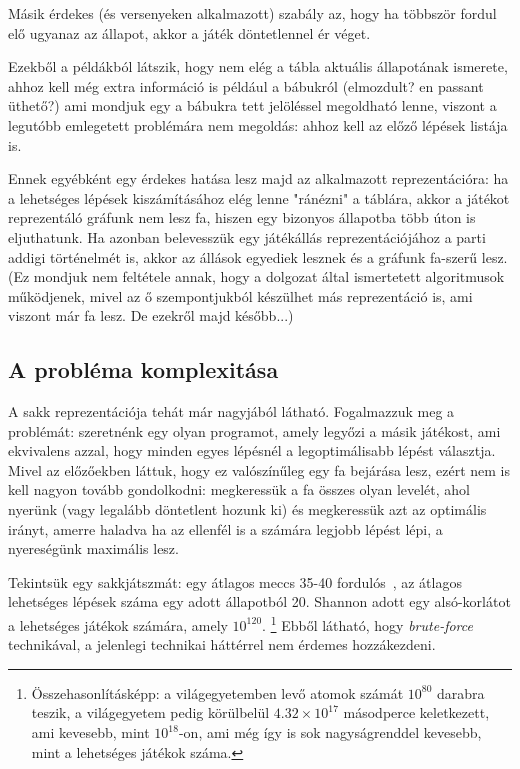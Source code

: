 \documentclass[twoside, a4paper, 12pt]{article}
\begin{document}
Másik érdekes (és versenyeken alkalmazott) szabály az, hogy ha többször fordul elő ugyanaz az állapot, akkor a játék döntetlennel ér véget.

Ezekből a példákból látszik, hogy nem elég a tábla aktuális állapotának ismerete, ahhoz kell még extra információ is például a bábukról (elmozdult? en passant üthető?) ami mondjuk egy a bábukra tett jelöléssel megoldható lenne, viszont a legutóbb emlegetett problémára nem megoldás: ahhoz kell az előző lépések listája is.

Ennek egyébként egy érdekes hatása lesz majd az alkalmazott reprezentációra: ha a lehetséges lépések kiszámításához elég lenne "ránézni" a táblára, akkor a játékot reprezentáló gráfunk nem lesz fa, hiszen egy bizonyos állapotba több úton is eljuthatunk. Ha azonban belevesszük egy játékállás reprezentációjához a parti addigi történelmét is, akkor az állások egyediek lesznek és a gráfunk fa-szerű lesz. (Ez mondjuk nem feltétele annak, hogy a dolgozat által ismertetett algoritmusok működjenek, mivel az ő szempontjukból készülhet más reprezentáció is, ami viszont már fa lesz. De ezekről majd később...)

\subsection{A probléma komplexitása}
A sakk reprezentációja tehát már nagyjából látható. Fogalmazzuk meg a problémát: szeretnénk egy olyan programot, amely legyőzi a másik játékost, ami ekvivalens azzal, hogy minden egyes lépésnél a legoptimálisabb lépést választja. Mivel az előzőekben láttuk, hogy ez valószínűleg egy fa bejárása lesz, ezért nem is kell nagyon tovább gondolkodni: megkeressük a fa összes olyan levelét, ahol nyerünk (vagy legalább döntetlent hozunk ki) és megkeressük azt az optimális irányt, amerre haladva ha az ellenfél is a számára legjobb lépést lépi, a nyereségünk maximális lesz.

Tekintsük egy sakkjátszmát: egy átlagos meccs 35-40 fordulós~\cite{averageLengthOfChessGame}\cite{averageLengthOfChessGame2}\cite{chessStatistics}, az átlagos lehetséges lépések száma egy adott állapotból 20\cite{shannonnumber}. Shannon adott egy alsó-korlátot a lehetséges játékok számára, amely $10^{120}$. \footnote{Összehasonlításképp: a világegyetemben levő atomok számát $10^{80}$ darabra teszik, a világegyetem pedig körülbelül $4.32 \times 10^{17}$ másodperce keletkezett, ami kevesebb, mint $10^{18}$-on, ami még így is sok nagyságrenddel kevesebb, mint a lehetséges játékok száma.} Ebből látható, hogy \textit{brute-force} technikával, a jelenlegi technikai háttérrel nem érdemes hozzákezdeni.
\end{document}
